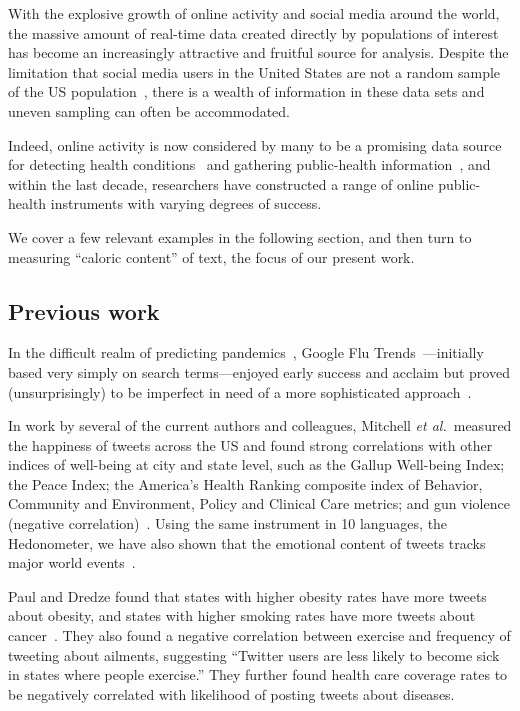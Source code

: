 \documentclass[10pt]{article}
\newcommand{\etal}{\textit{et al.}}
\begin{document}
With the explosive growth of online activity and social
media around the world, the massive amount of real-time
data created directly by populations
of interest has become an increasingly attractive and fruitful
source for analysis.
Despite the
limitation that social media users in the United States 
are not a random sample of the US 
population~\cite{pew}, 
there is a wealth of information in these data sets and uneven
sampling can often be accommodated.

Indeed, online activity is now considered by many to be a promising 
data source for detecting health
conditions~\cite{signorini2011,prieto2014} and 
gathering 
public-health
information~\cite{chew2010,paul2011},
and within the last decade, researchers have constructed a range of
online public-health instruments with varying degrees of success.

We cover a few relevant examples in the following section, and then turn
to measuring ``caloric content'' of text, the focus of our present work.

\subsection*{Previous work}
\label{subsec:fluxwell.previouswork}

In the difficult realm of predicting pandemics~\cite{watts2005a}, 
Google Flu Trends~\cite{googleflutrends2015a}---initially 
based very simply on search terms---enjoyed early success and acclaim 
but proved (unsurprisingly)
to be imperfect in need of a more sophisticated approach~\cite{lazer2014a}.

In work by several of the current authors and colleagues,
Mitchell \etal\ measured the happiness of tweets across the US  and found
strong correlations with other indices of well-being at city
and state level, such as the
Gallup Well-being Index; the Peace Index; the America's Health Ranking
composite index of Behavior, Community and Environment, Policy and
Clinical Care metrics; and gun violence (negative
correlation)~\cite{mitchell2013a}. 
Using the same instrument in 10 languages, the Hedonometer, 
we have also shown that 
the emotional content of tweets tracks major world
events~\cite{dodds2011e,dodds2015a}.

Paul and Dredze found that states with higher
obesity rates have more tweets about obesity, and states with higher
smoking rates have more tweets about cancer~\cite{paul2011}.  They also found a
negative correlation between exercise and frequency of tweeting about
ailments, suggesting ``Twitter
users are less likely to become sick in states where people exercise.''
They further found health care coverage rates to be
negatively correlated with likelihood of posting tweets about
diseases.  
\end{document}
